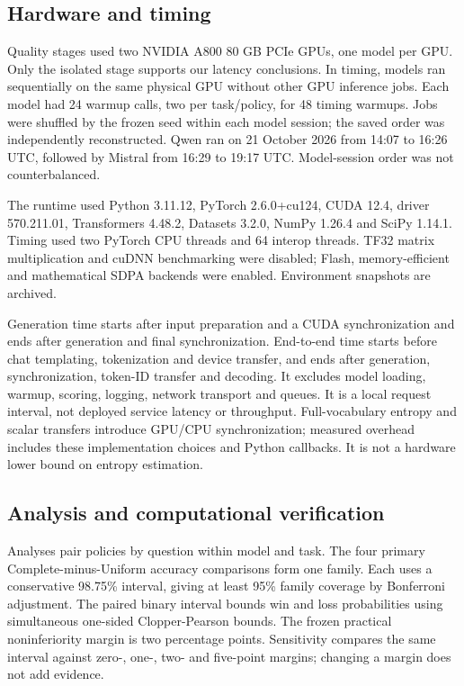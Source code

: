 \documentclass[12pt,a4paper]{article}
\begin{document}
\subsection{Hardware and timing}
Quality stages used two NVIDIA A800 80 GB PCIe GPUs, one model per GPU. Only the isolated stage supports our latency conclusions. In timing, models ran sequentially on the same physical GPU without other GPU inference jobs. Each model had 24 warmup calls, two per task/policy, for 48 timing warmups. Jobs were shuffled by the frozen seed within each model session; the saved order was independently reconstructed. Qwen ran on 21 October 2026 from 14:07 to 16:26 UTC, followed by Mistral from 16:29 to 19:17 UTC. Model-session order was not counterbalanced.

The runtime used Python 3.11.12, PyTorch 2.6.0+cu124, CUDA 12.4, driver 570.211.01, Transformers 4.48.2, Datasets 3.2.0, NumPy 1.26.4 and SciPy 1.14.1. Timing used two PyTorch CPU threads and 64 interop threads. TF32 matrix multiplication and cuDNN benchmarking were disabled; Flash, memory-efficient and mathematical SDPA backends were enabled. Environment snapshots are archived.

Generation time starts after input preparation and a CUDA synchronization and ends after generation and final synchronization. End-to-end time starts before chat templating, tokenization and device transfer, and ends after generation, synchronization, token-ID transfer and decoding. It excludes model loading, warmup, scoring, logging, network transport and queues. It is a local request interval, not deployed service latency or throughput. Full-vocabulary entropy and scalar transfers introduce GPU/CPU synchronization; measured overhead includes these implementation choices and Python callbacks. It is not a hardware lower bound on entropy estimation.

\subsection{Analysis and computational verification}
Analyses pair policies by question within model and task. The four primary Complete-minus-Uniform accuracy comparisons form one family. Each uses a conservative 98.75\% interval, giving at least 95\% family coverage by Bonferroni adjustment. The paired binary interval bounds win and loss probabilities using simultaneous one-sided Clopper-Pearson bounds. The frozen practical noninferiority margin is two percentage points. Sensitivity compares the same interval against zero-, one-, two- and five-point margins; changing a margin does not add evidence.
\end{document}
